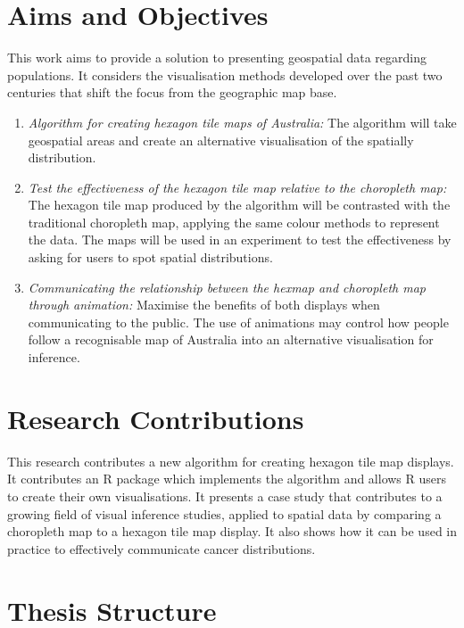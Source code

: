 \documentclass{monashthesis}
\begin{document}
\hypertarget{aims-and-objectives}{%
\section{Aims and Objectives}\label{aims-and-objectives}}

This work aims to provide a solution to presenting geospatial data regarding populations.
It considers the visualisation methods developed over the past two centuries that shift the focus from the geographic map base.

\begin{enumerate}
\def\labelenumi{\arabic{enumi}.}
\item
  \emph{Algorithm for creating hexagon tile maps of Australia:} The algorithm will take geospatial areas and create an alternative visualisation of the spatially distribution.
\item
  \emph{Test the effectiveness of the hexagon tile map relative to the choropleth map:} The hexagon tile map produced by the algorithm will be contrasted with the traditional choropleth map, applying the same colour methods to represent the data. The maps will be used in an experiment to test the effectiveness by asking for users to spot spatial distributions.
\item
  \emph{Communicating the relationship between the hexmap and choropleth map through animation:} Maximise the benefits of both displays when communicating to the public. The use of animations may control how people follow a recognisable map of Australia into an alternative visualisation for inference.
\end{enumerate}

\hypertarget{research-contributions}{%
\section{Research Contributions}\label{research-contributions}}

This research contributes a new algorithm for creating hexagon tile map displays. It contributes an R \autocite{R} package which implements the algorithm and allows R users to create their own visualisations.
It presents a case study that contributes to a growing field of visual inference studies, applied to spatial data by comparing a choropleth map to a hexagon tile map display.
It also shows how it can be used in practice to effectively communicate cancer distributions.

\hypertarget{thesis-structure}{%
\section{Thesis Structure}\label{thesis-structure}}
\end{document}
